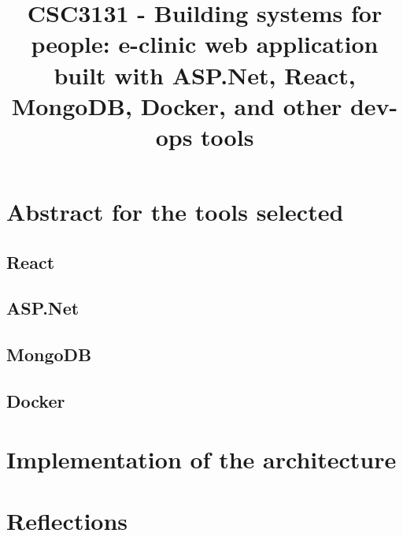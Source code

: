 \documentclass{article}
\title{CSC3131 - Building systems for people: e-clinic web application built with ASP.Net, React, MongoDB, Docker, and other dev-ops tools}
\begin{document}
\maketitle
\section{Abstract for the tools selected}
\subsection{React}
\subsection{ASP.Net}
\subsection{MongoDB}
\subsection{Docker}

\section{Implementation of the architecture}

\section{Reflections}
\end{document}
